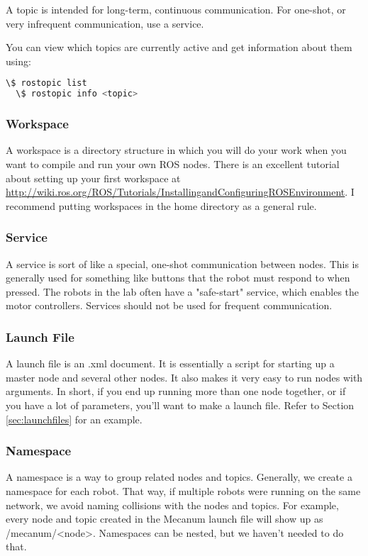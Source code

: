A topic is intended for long-term, continuous communication. For one-shot, or very infrequent communication, use a service.

You can view which topics are currently active and get information about them using:

\begin{lstlisting}[language=bash]
  \$ rostopic list
  \$ rostopic info <topic>
\end{lstlisting}

\subsubsection{Workspace}

A workspace is a directory structure in which you will do your work when you want to compile and run your own ROS nodes. There is an excellent tutorial about setting up your first workspace at \url{http://wiki.ros.org/ROS/Tutorials/InstallingandConfiguringROSEnvironment}. I recommend putting workspaces in the home directory as a general rule.

\subsubsection{Service}

A service is sort of like a special, one-shot communication between nodes. This is generally used for something like buttons that the robot must respond to when pressed. The robots in the lab often have a "safe-start" service, which enables the motor controllers. Services should not be used for frequent communication.

\subsubsection{Launch File}

A launch file is an .xml document. It is essentially a script for starting up a master node and several other nodes. It also makes it very easy to run nodes with arguments. In short, if you end up running more than one node together, or if you have a lot of parameters, you'll want to make a launch file. Refer to Section \ref{sec:launchfiles} for an example.

\subsubsection{Namespace}

A namespace is a way to group related nodes and topics. Generally, we create a namespace for each robot. That way, if multiple robots were running on the same network, we avoid naming collisions with the nodes and topics. For example, every node and topic created in the Mecanum launch file will show up as /mecanum/<node>. Namespaces can be nested, but we haven't needed to do that.

